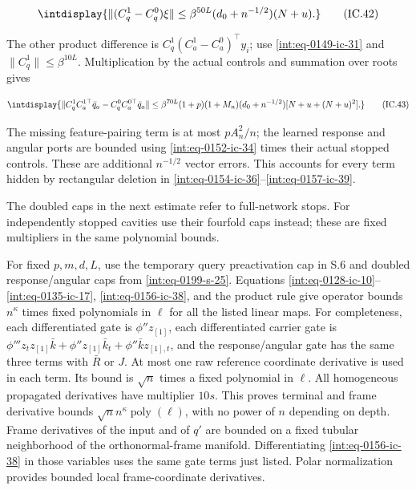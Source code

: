 \begingroup\renewcommand{\theHequation}{intdisplay.343}
\begin{equation}
\intdisplay{
\|(C_q^1-C_q^0)\xi\|
 \le\beta^{50L}(d_0+n^{-1/2})(N+u).
}
\tag{IC.42}
\label{int:eq-0160-ic-42}
\end{equation}
\endgroup


The other product difference is \(C_q^1(C_a^1-C_a^0)^\top y_i\); use \eqref{int:eq-0149-ic-31} and \(\|C_q^1\|\le\beta^{10L}\). Multiplication by the actual controls and summation over roots gives


\begingroup\renewcommand{\theHequation}{intdisplay.344}
\begin{equation}
\intdisplay{
\|C_q^1C_a^{1\top}\bar q_a-C_q^0C_a^{0\top}\bar q_a\|
 \le\beta^{70L}(1+p)(1+M_n)
 (d_0+n^{-1/2})[N+u+(N+u)^2].
}
\tag{IC.43}
\label{int:eq-0161-ic-43}
\end{equation}
\endgroup


The missing feature-pairing term is at most \(pA_n^2/n\); the learned response and angular ports are bounded using \eqref{int:eq-0152-ic-34} times their actual stopped controls. These are additional \(n^{-1/2}\) vector errors. This accounts for every term hidden by rectangular deletion in \eqref{int:eq-0154-ic-36}--\allowbreak \eqref{int:eq-0157-ic-39}.



The doubled caps in the next estimate refer to full-network stops.
For independently stopped cavities use their fourfold caps instead;
these are fixed multipliers in the same polynomial bounds.

For fixed \(p,\allowbreak m,\allowbreak d,\allowbreak L\), use the temporary query preactivation cap in S.6 and doubled response/angular caps from \eqref{int:eq-0199-s-25}. Equations \eqref{int:eq-0128-ic-10}--\allowbreak \eqref{int:eq-0135-ic-17}, \eqref{int:eq-0156-ic-38}, and the product rule give operator bounds \(n^\kappa\) times fixed polynomials in \(\ell\) for all the listed linear maps. For completeness, each differentiated gate is \(\phi''z_{[1]}\), each differentiated carrier gate is \(\phi'''z_t z_{[1]}\bar k+\phi''z_{[1]}\bar k_t +\phi''\bar k z_{[1],\allowbreak t}\), and the response/angular gate has the same three terms with \(\bar R\) or \(J\). At most one raw reference coordinate derivative is used in each term. Its bound is \(\sqrt n\) times a fixed polynomial in \(\ell\). All homogeneous propagated derivatives have multiplier \(10s\). This proves terminal and frame derivative bounds \(\sqrt n n^\kappa\operatorname{poly}(\ell)\), with no power of \(n\) depending on depth. Frame derivatives of the input and of \(q'\) are bounded on a fixed tubular neighborhood of the orthonormal-frame manifold. Differentiating \eqref{int:eq-0156-ic-38} in those variables uses the same gate terms just listed. Polar normalization provides bounded local frame-coordinate derivatives.


